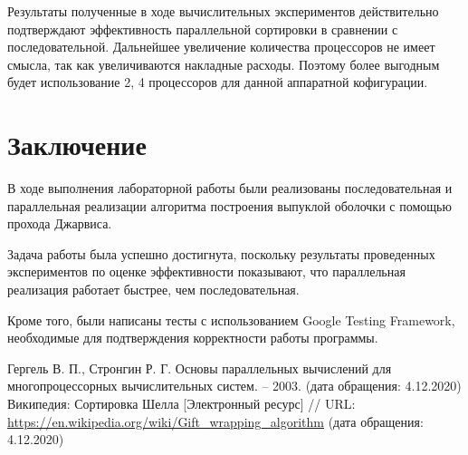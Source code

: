 \documentclass{report}
\begin{document}
\par Результаты полученные в ходе вычислительных экспериментов действительно подтверждают эффективность параллельной сортировки в сравнении с последовательной. Дальнейшее увеличение количества процессоров не имеет смысла, так как увеличиваются накладные расходы. Поэтому более выгодным будет использование 2, 4 процессоров для данной аппаратной кофигурации.
\newpage

\section*{Заключение}
В ходе выполнения лабораторной работы были реализованы последовательная и параллельная реализации алгоритма построения выпуклой оболочки с помощью прохода Джарвиса.
\par Задача работы была успешно достигнута, поскольку результаты проведенных экспериментов по оценке эффективности показывают, что параллельная реализация работает быстрее, чем последовательная.
\par Кроме того, были написаны тесты с использованием Google Testing Framework, необходимые для подтверждения корректности работы программы.
\newpage

\begin{thebibliography}{1}
 Гергель В. П., Стронгин Р. Г. Основы параллельных вычислений для многопроцессорных вычислительных систем. – 2003. (дата обращения: 4.12.2020)
 Википедия: Сортировка Шелла [Электронный ресурс] // URL: \url {https://en.wikipedia.org/wiki/Gift_wrapping_algorithm} (дата обращения: 4.12.2020)
\end{thebibliography}
\newpage

\end{document}
